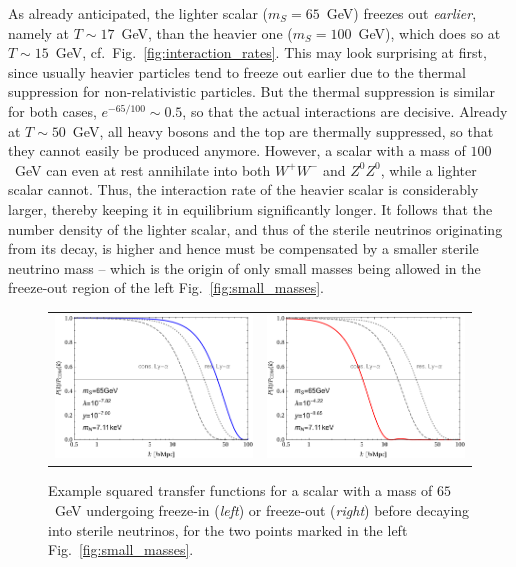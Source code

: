 As already anticipated, the lighter scalar ($m_S = 65$~GeV) freezes out \emph{earlier}, namely at $T\sim 17$~GeV, than the heavier one ($m_S = 100$~GeV), which does so at $T\sim 15$~GeV, cf.\ Fig.~\ref{fig:interaction_rates}. This may look surprising at first, since usually heavier particles tend to freeze out earlier due to the thermal suppression for non-relativistic particles. But the thermal suppression is similar for both cases, $e^{-65/100} \sim 0.5$, so that the actual interactions are decisive. Already at $T\sim 50$~GeV, all heavy bosons and the top are thermally suppressed, so that they cannot easily be produced anymore. However, a scalar with a mass of $100$~GeV can even at rest annihilate into both $W^+ W^-$ and $Z^0 Z^0$, while a lighter scalar cannot. Thus, the interaction rate of the heavier scalar is considerably larger, thereby keeping it in equilibrium significantly longer. It follows that the number density of the lighter scalar, and thus of the sterile neutrinos originating from its decay, is higher and hence must be compensated by a smaller sterile neutrino mass -- which is the origin of only small masses being allowed in the freeze-out region of the left Fig.~\ref{fig:small_masses}.

\begin{figure}[t]
\begin{tabular}{lr}\hspace{-1cm}
 \includegraphics[width=8.3cm]{figures/SquaredTF_mS_65_FIMP.pdf} & \includegraphics[width=8.3cm]{figures/SquaredTF_mS_65_WIMP.pdf}
\end{tabular}
\caption{\label{fig:TF_65}Example squared transfer functions for a scalar with a mass of $65$~GeV undergoing freeze-in (\emph{left}) or freeze-out (\emph{right}) before decaying into sterile neutrinos, for the two points marked in the left Fig.~\ref{fig:small_masses}.}
\end{figure}

